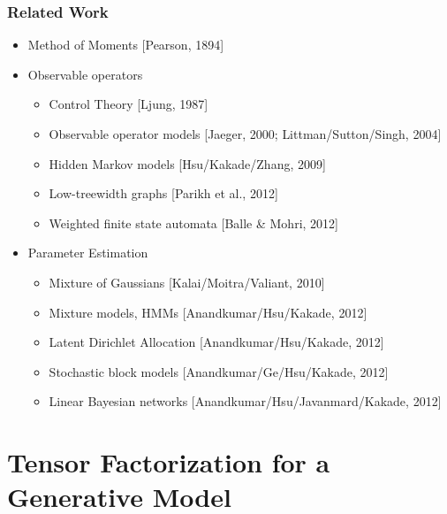 \documentclass[xcolor={svgnames}]{beamer}
\begin{document}
\begin{frame}
  \frametitle{Related Work}
  \begin{itemize}
    \item<1-> Method of Moments [Pearson, 1894]
    \item<2-> Observable operators
    \begin{itemize}
      \item Control Theory [Ljung, 1987]
      \item Observable operator models [Jaeger, 2000; {\small{Littman/Sutton/Singh, 2004}}]
      \item Hidden Markov models [Hsu/Kakade/Zhang, 2009]
      \item Low-treewidth graphs [Parikh et al., 2012]
      \item Weighted finite state automata [Balle \& Mohri, 2012]
    \end{itemize}
     \item<3-> Parameter Estimation
  \begin{itemize}
    \item Mixture of Gaussians [Kalai/Moitra/Valiant, 2010]
    \item \alert{Mixture models, HMMs [Anandkumar/Hsu/Kakade, 2012]}
    \item Latent Dirichlet Allocation [Anandkumar/Hsu/Kakade, 2012]
    \item Stochastic block models [Anandkumar/Ge/Hsu/Kakade, 2012]
    \item Linear Bayesian networks [Anandkumar/Hsu/Javanmard/Kakade, 2012]
  \end{itemize}
  \end{itemize}
\end{frame}

\section{Tensor Factorization for a Generative Model}
\end{document}
